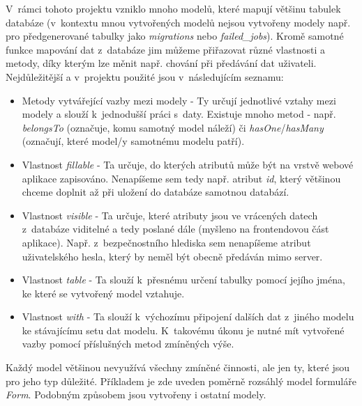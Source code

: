 	V~rámci tohoto projektu vzniklo mnoho modelů, které mapují většinu tabulek databáze (v~kontextu mnou vytvořených modelů nejsou vytvořeny modely např. pro předgenerované tabulky jako \textit{migrations} nebo \textit{failed\_jobs}). Kromě samotné funkce mapování dat z~databáze jim můžeme přiřazovat různé vlastnosti a metody, díky kterým lze měnit např. chování při předávání dat uživateli. Nejdůležitější a v~projektu použité jsou v~následujícím seznamu:
	
	\begin{itemize}
		\item Metody vytvářející vazby mezi modely - Ty určují jednotlivé vztahy mezi modely a slouží k~jednodušší práci s~daty. Existuje mnoho metod - např. \textit{belongsTo} (označuje, komu samotný model náleží) či \textit{hasOne}/\textit{hasMany} (označují, které model/y samotnému modelu patří). \cite{LaravelORM}
		\item Vlastnost \textit{fillable} - Ta určuje, do kterých atributů může být na vrstvě webové aplikace zapisováno. Nenapíšeme sem tedy např. atribut \textit{id}, který většinou chceme doplnit až při uložení do databáze samotnou databází. \cite{LaravelORM}
		\item Vlastnost \textit{visible} - Ta určuje, které atributy jsou ve vrácených datech z~databáze viditelné a tedy poslané dále (myšleno na frontendovou část aplikace). Např. z~bezpečnostního hlediska sem nenapíšeme atribut uživatelského hesla, který by neměl být obecně předáván mimo server. \cite{LaravelORM}
		\item Vlastnost \textit{table} - Ta slouží k~přesnému určení tabulky pomocí jejího jména, ke které se vytvořený model vztahuje. \cite{LaravelORM}
		\item Vlastnost \textit{with} - Ta slouží k~výchozímu připojení dalších dat z~jiného modelu ke stávajícímu setu dat modelu. K~takovému úkonu je nutné mít vytvořené vazby pomocí příslušných metod zmíněných výše. \cite{LaravelORM}
	\end{itemize}

	Každý model většinou nevyužívá všechny zmíněné činnosti, ale jen ty, které jsou pro jeho typ důležité. Příkladem je zde uveden poměrně rozsáhlý model formuláře \textit{Form}. Podobným způsobem jsou vytvořeny i ostatní modely.
	
